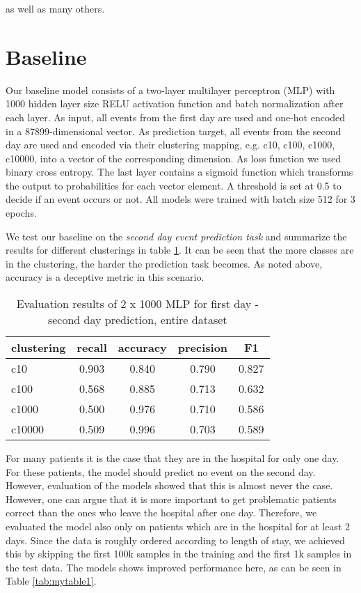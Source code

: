 as well as many others.

\newpage
\section{Baseline}
\label{sec:baseline}

Our baseline model consists of a two-layer multilayer perceptron (MLP) with 1000 hidden layer size RELU \cite{agarapDeepLearningUsing2018} activation function and batch normalization after each layer. As input, all events from the first day are used and one-hot encoded in a 87899-dimensional vector. As prediction target, all events from the second day are used and encoded via their clustering mapping, e.g. c10, c100, c1000, c10000, into a vector of the corresponding dimension. As loss function we used binary cross entropy. The last layer contains a sigmoid function which transforms the output to probabilities for each vector element. A threshold is set at 0.5 to decide if an event occurs or not. All models were trained with batch size 512 for 3 epochs.

We test our baseline on the \emph{second day event prediction task} and summarize the results for different clusterings in table \ref{tab:mytable2}. It can be seen that the more classes are in the clustering, the harder the prediction task becomes. As noted above, accuracy is a deceptive metric in this scenario.

\begin{table}[H]
  \centering
    \begin{tabular}{lcccc} \toprule
        {clustering} & {recall} & {accuracy} & {precision} & {F1}  \\ \midrule
        {c10}  & 0.903 & 0.840 & 0.790 & 0.827 \\
        {c100}  & 0.568 & 0.885 & 0.713 & 0.632 \\
        {c1000}  & 0.500  & 0.976 & 0.710  & 0.586 \\
        {c10000}  & 0.509  & 0.996 &  0.703  & 0.589 \\ \midrule
    \end{tabular}
  \caption{Evaluation results of 2 x 1000 MLP for first day - second day  prediction, entire dataset}
  \label{tab:mytable2}
\end{table}



For many patients it is the case that they are in the hospital for only one day. For these patients, the model should predict no event on the second day. However, evaluation of the models showed that this is almost never the case. However, one can argue that it is more important to get problematic patients correct than the ones who leave the hospital after one day. Therefore, we evaluated the model also only on patients which are in the hospital for at least 2 days. Since the data is roughly ordered according to length of stay, we achieved this by skipping the first 100k samples in the training and the first 1k samples in the test data. The models shows improved performance here, as can be seen in Table \ref{tab:mytable1}.


